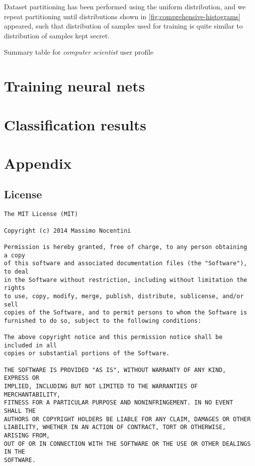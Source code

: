 \documentclass[10pt,a4paper]{article}
\begin{document}
    Dataset partitioning has been performed using the uniform distribution, and we 
    repeat partitioning until distributions shown in \autoref{fig:comprehensive-histograms}
    appeared, such that distribution of samples used for training is quite similar
    to distribution of samples kept secret.

    \begin{table}
      \begin{adjustwidth}{-4cm}{}
            
      \end{adjustwidth}
      \caption{Summary table for \emph{computer scientist} user profile}
      \label{fig:computer-scientist-user-profile}
    \end{table}

    \section{Training neural nets}
    \lipsum[1]

    \section{Classification results}
    \lipsum[1]

    \newpage

    \section{Appendix}
    \label{sec:appendix}

    \subsection{License}
\begin{verbatim}
The MIT License (MIT)

Copyright (c) 2014 Massimo Nocentini

Permission is hereby granted, free of charge, to any person obtaining a copy
of this software and associated documentation files (the "Software"), to deal
in the Software without restriction, including without limitation the rights
to use, copy, modify, merge, publish, distribute, sublicense, and/or sell
copies of the Software, and to permit persons to whom the Software is
furnished to do so, subject to the following conditions:

The above copyright notice and this permission notice shall be included in all
copies or substantial portions of the Software.

THE SOFTWARE IS PROVIDED "AS IS", WITHOUT WARRANTY OF ANY KIND, EXPRESS OR
IMPLIED, INCLUDING BUT NOT LIMITED TO THE WARRANTIES OF MERCHANTABILITY,
FITNESS FOR A PARTICULAR PURPOSE AND NONINFRINGEMENT. IN NO EVENT SHALL THE
AUTHORS OR COPYRIGHT HOLDERS BE LIABLE FOR ANY CLAIM, DAMAGES OR OTHER
LIABILITY, WHETHER IN AN ACTION OF CONTRACT, TORT OR OTHERWISE, ARISING FROM,
OUT OF OR IN CONNECTION WITH THE SOFTWARE OR THE USE OR OTHER DEALINGS IN THE
SOFTWARE.
\end{verbatim}
\end{document}
